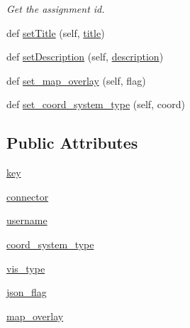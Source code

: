 \begin{DoxyCompactItemize}
\begin{DoxyCompactList}\small\item\em Get the assignment id. \end{DoxyCompactList}\item 
def \mbox{\hyperlink{class_bridges_1_1_bridges_1_1_bridges_ab72d30d944cb57f8a5343143cc030dc2}{set\+Title}} (self, \mbox{\hyperlink{class_bridges_1_1_bridges_1_1_bridges_a977ab3147c2a675bfd78dd199a9644ec}{title}})
\item 
def \mbox{\hyperlink{class_bridges_1_1_bridges_1_1_bridges_aa0a396dc490f1626608d9538822af1c1}{set\+Description}} (self, \mbox{\hyperlink{class_bridges_1_1_bridges_1_1_bridges_a11a96ac7da5095bbbe357c67521660b5}{description}})
\item 
def \mbox{\hyperlink{class_bridges_1_1_bridges_1_1_bridges_a5bbbed2d5808865771bbad1439c85460}{set\+\_\+map\+\_\+overlay}} (self, flag)
\item 
def \mbox{\hyperlink{class_bridges_1_1_bridges_1_1_bridges_ae1fa0dd1d4c8070d7746a5fdbf7cd4f0}{set\+\_\+coord\+\_\+system\+\_\+type}} (self, coord)
\end{DoxyCompactItemize}
\subsection*{Public Attributes}
\begin{DoxyCompactItemize}
\item 
\mbox{\hyperlink{class_bridges_1_1_bridges_1_1_bridges_aa9cbb19b029f0c5257f4a605e8de1097}{key}}
\item 
\mbox{\hyperlink{class_bridges_1_1_bridges_1_1_bridges_a0101c37e64215a6ef4923bd8fc4339e1}{connector}}
\item 
\mbox{\hyperlink{class_bridges_1_1_bridges_1_1_bridges_a65b7ea93a38533a0f875e5f3e5d80caf}{username}}
\item 
\mbox{\hyperlink{class_bridges_1_1_bridges_1_1_bridges_a7fe418e690031cdd2c10a5841497304b}{coord\+\_\+system\+\_\+type}}
\item 
\mbox{\hyperlink{class_bridges_1_1_bridges_1_1_bridges_aea9edc834f1fc1dcfb1ca53d82eba33a}{vis\+\_\+type}}
\item 
\mbox{\hyperlink{class_bridges_1_1_bridges_1_1_bridges_a988f7f1b547deff8f5978d849ed1be30}{json\+\_\+flag}}
\item 
\mbox{\hyperlink{class_bridges_1_1_bridges_1_1_bridges_adc6bb7b47d0e2faf4db40b74a2bcfe81}{map\+\_\+overlay}}
\end{DoxyCompactItemize}
